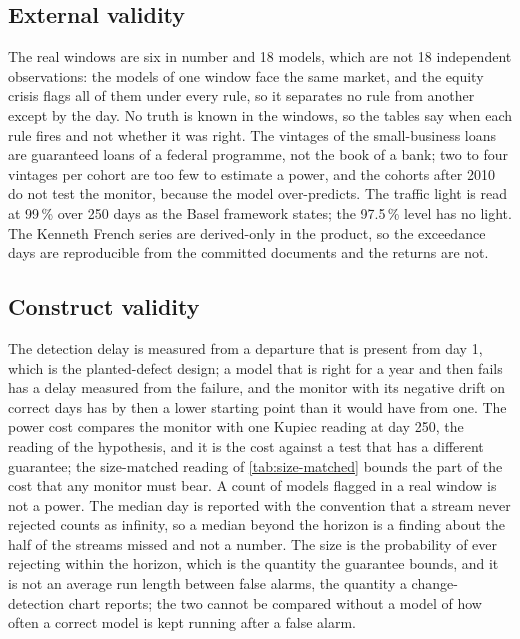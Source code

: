 \subsection{External validity}
\label{sec:limitations-external}

The real windows are six in number and 18 models, which are not 18 independent observations: the models of one window face the same market, and the equity crisis flags all of them under every rule, so it separates no rule from another except by the day. No truth is known in the windows, so the tables say when each rule fires and not whether it was right. The vintages of the small-business loans are guaranteed loans of a federal programme, not the book of a bank; two to four
vintages per cohort are too few to estimate a power, and the cohorts after 2010 do not test the monitor, because the model over-predicts. The traffic light is read at 99\,\% over 250 days as the Basel framework states; the 97.5\,\% level has no light. The Kenneth French series are derived-only in the product, so the exceedance days are reproducible from the committed documents and the returns are not.

\subsection{Construct validity}
\label{sec:limitations-construct}

The detection delay is measured from a departure that is present from day 1, which is the planted-defect design; a model that is right for a year and then fails has a delay measured from the failure, and the monitor with its negative drift on correct days has by then a lower starting point than it would have from one. The power cost compares the monitor with one Kupiec reading at day 250, the reading of the hypothesis, and it is the cost against a test that has a different guarantee; the size-matched reading of \cref{tab:size-matched} bounds the part of the cost that any monitor must bear.
A count of models flagged in a real window is not a power. The median day is reported with the convention that a stream never rejected counts as infinity, so a median beyond the horizon is a finding about the half of the streams missed and not a number. The size is the probability of ever rejecting within the horizon, which is the quantity the guarantee bounds, and it is not an average run length between false alarms, the quantity a change-detection chart reports; the two cannot be compared without a model of how often a correct model is kept running after a false alarm.

